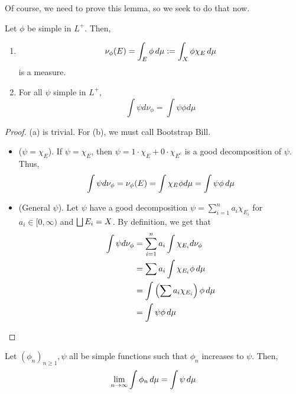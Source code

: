 \documentclass[11pt,leqno,oneside]{amsbook}
\numberwithin{thm}{section}
\begin{document}
Of course, we need to prove this lemma, so we seek to do that now.
\begin{prop}
  Let $\phi$ be simple in $L^+$. Then,
  \begin{enumerate}
  \item \[
      \nu_\phi(E) = \int_E \phi \, d\mu := \int_X \phi \chi_E \, d\mu
    \]
    is a measure.
  \item For all $\psi$ simple in $L^+$, \[
      \int \psi d\nu_\phi = \int \psi \phi d \mu
    \]
  \end{enumerate}
  \begin{proof}
    (a) is trivial. For (b), we must call Bootstrap Bill.
    \begin{itemize}
    \item ($\psi = \chi_E$). If $\psi = \chi_E$, then $\psi = 1 \cdot
      \chi_E + 0 \cdot \chi_{E^c}$ is a good decomposition of
      $\psi$. Thus, \[
        \int \psi d\nu_\phi = \nu_\phi(E) = \int \chi_E \phi d \mu =
        \int \psi \phi \, d\mu
      \]
    \item (General $\psi$). Let $\psi$ have a good decomposition $\psi
      = \sum_{i=1}^n a_i \chi_{E_i}$ for $a_i \in [0,\infty)$ and
      $\bigsqcup E_i = X$. By definition, we get that
      \begin{align*}
        \int \psi d\nu_\phi & = \sum_{i=1}^n a_i \int \chi_{E_i} d
                         \nu_\phi \\
                       & = \sum a_i \int \chi_{E_i} \phi \, d\mu \\
                       & = \int \left( \sum a_i \chi_{E_i} \right)
                         \phi \, d\mu \\
        & = \int \psi \phi \, d\mu
      \end{align*}
    \end{itemize}
  \end{proof}
\end{prop}
\begin{prop}
  Let \((\phi_n)_{n \geq 1}, \psi\) all be simple functions such that
  \(\phi_n\) increases to \(\psi\). Then, \[
    \lim_{n \to \infty} \int \phi_n \, d\mu = \int \psi \, d\mu
  \]
\end{prop}
\end{document}
